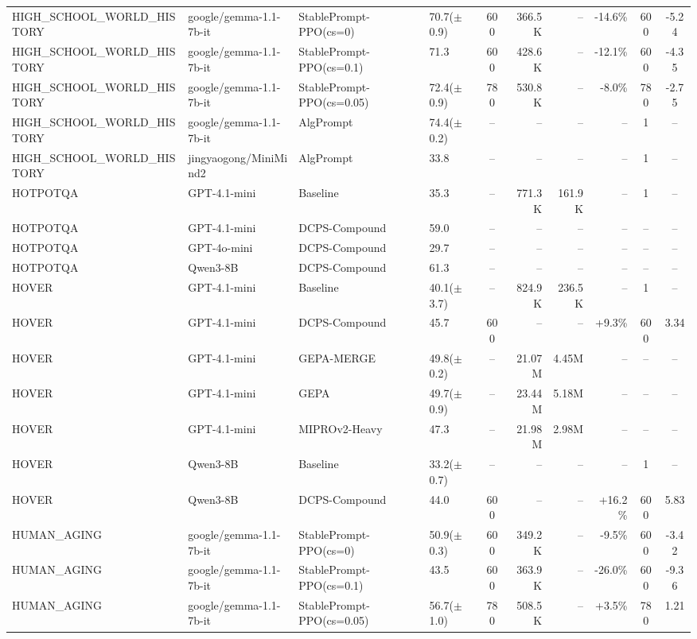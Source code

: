 {\begin{longtable}{@{}p{5.5cm}p{4.5cm}p{2.5cm}lcrrrcc@{}}
\midrule
HIGH\_SCHOOL\_WORLD\_HISTORY & google/gemma-1.1-7b-it & StablePrompt-PPO(cs=0) & 70.7($\pm$0.9) & 600 & 366.5K & -- & -14.6\% & 600 & -5.24 \\
HIGH\_SCHOOL\_WORLD\_HISTORY & google/gemma-1.1-7b-it & StablePrompt-PPO(cs=0.1) & 71.3 & 600 & 428.6K & -- & -12.1\% & 600 & -4.35 \\
HIGH\_SCHOOL\_WORLD\_HISTORY & google/gemma-1.1-7b-it & StablePrompt-PPO(cs=0.05) & 72.4($\pm$0.9) & 780 & 530.8K & -- & -8.0\% & 780 & -2.75 \\
HIGH\_SCHOOL\_WORLD\_HISTORY & google/gemma-1.1-7b-it & AlgPrompt & 74.4($\pm$0.2) & -- & -- & -- & -- & 1 & -- \\
\midrule
HIGH\_SCHOOL\_WORLD\_HISTORY & jingyaogong/MiniMind2 & AlgPrompt & 33.8 & -- & -- & -- & -- & 1 & -- \\
\midrule
HOTPOTQA & GPT-4.1-mini & Baseline & 35.3 & -- & 771.3K & 161.9K & -- & 1 & -- \\
HOTPOTQA & GPT-4.1-mini & DCPS-Compound & 59.0 & -- & -- & -- & -- & -- & -- \\
\midrule
HOTPOTQA & GPT-4o-mini & DCPS-Compound & 29.7 & -- & -- & -- & -- & -- & -- \\
\midrule
HOTPOTQA & Qwen3-8B & DCPS-Compound & 61.3 & -- & -- & -- & -- & -- & -- \\
\midrule
HOVER & GPT-4.1-mini & Baseline & 40.1($\pm$3.7) & -- & 824.9K & 236.5K & -- & 1 & -- \\
HOVER & GPT-4.1-mini & DCPS-Compound & 45.7 & 600 & -- & -- & +9.3\% & 600 & 3.34 \\
HOVER & GPT-4.1-mini & GEPA-MERGE & 49.8($\pm$0.2) & -- & 21.07M & 4.45M & -- & -- & -- \\
HOVER & GPT-4.1-mini & GEPA & 49.7($\pm$0.9) & -- & 23.44M & 5.18M & -- & -- & -- \\
HOVER & GPT-4.1-mini & MIPROv2-Heavy & 47.3 & -- & 21.98M & 2.98M & -- & -- & -- \\
\midrule
HOVER & Qwen3-8B & Baseline & 33.2($\pm$0.7) & -- & -- & -- & -- & 1 & -- \\
HOVER & Qwen3-8B & DCPS-Compound & 44.0 & 600 & -- & -- & +16.2\% & 600 & 5.83 \\
\midrule
HUMAN\_AGING & google/gemma-1.1-7b-it & StablePrompt-PPO(cs=0) & 50.9($\pm$0.3) & 600 & 349.2K & -- & -9.5\% & 600 & -3.42 \\
HUMAN\_AGING & google/gemma-1.1-7b-it & StablePrompt-PPO(cs=0.1) & 43.5 & 600 & 363.9K & -- & -26.0\% & 600 & -9.36 \\
HUMAN\_AGING & google/gemma-1.1-7b-it & StablePrompt-PPO(cs=0.05) & 56.7($\pm$1.0) & 780 & 508.5K & -- & +3.5\% & 780 & 1.21 \\

\end{longtable}}
